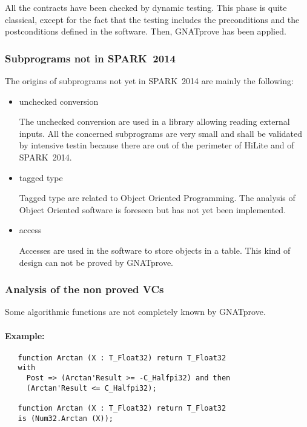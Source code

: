 \documentclass[10pt,a4paper,twocolumn]{article}
\newcommand{\gnatprove}{GNATprove\xspace}
\newcommand{\newspark}{SPARK~2014\xspace}
\begin{document}
All the contracts have been checked by dynamic testing. This phase is quite classical, except for the fact that the testing includes the preconditions and the postconditions defined in the software. Then, \gnatprove has been applied.

\ifdefined\abstractonly
\else
\subsubsection{Subprograms not in \newspark}

The origins of subprograms not yet in \newspark are mainly the following:

\begin{itemize}
\item unchecked conversion

The unchecked conversion are used in a library allowing reading external inputs.
All the concerned subprograms are very small and shall be validated by intensive testin because there are out of the perimeter of HiLite and of \newspark.
\item tagged type

Tagged type are related to Object Oriented Programming. The analysis of Object Oriented software is foreseen but has not yet been implemented.
\item access

Accesses are used in the software to store objects in a table.
This kind of design can not be proved by \gnatprove.
\end{itemize}

\subsubsection{Analysis of the non proved VCs}

Some algorithmic functions are not completely known by \gnatprove.

\paragraph{Example:}

\begin{verbatim}
   function Arctan (X : T_Float32) return T_Float32
   with
     Post => (Arctan'Result >= -C_Halfpi32) and then
     (Arctan'Result <= C_Halfpi32);

   function Arctan (X : T_Float32) return T_Float32
   is (Num32.Arctan (X));
\end{verbatim}
\end{document}
